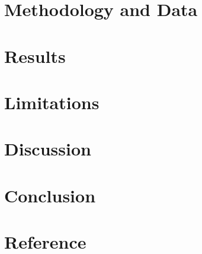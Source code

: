 \documentclass{cup-ino}
\theoremstyle{definition}
\numberwithin{equation}{subsection}
\begin{document}
\begin{flushleft}
\section{Methodology and Data}


\section{Results}


\section{Limitations}


\section{Discussion}


\section{Conclusion}


\section{Reference}



\end{flushleft}
\end{document}
